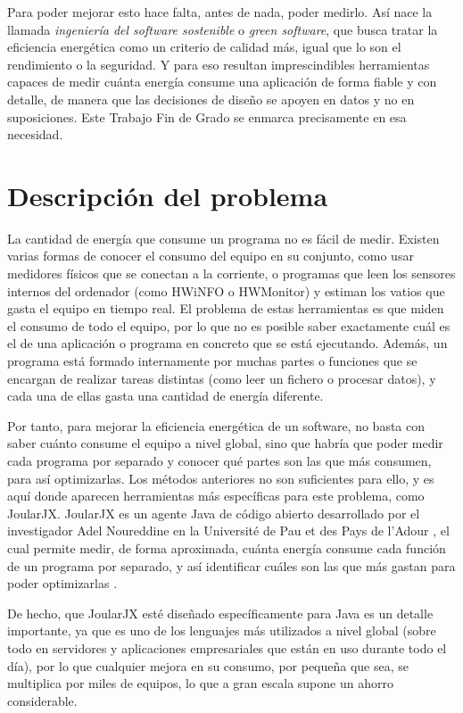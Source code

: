 Para poder mejorar esto hace falta, antes de nada, poder medirlo. Así nace la
llamada \emph{ingeniería del software sostenible} o \emph{green software}, que
busca tratar la eficiencia energética como un criterio de calidad más, igual
que lo son el rendimiento o la seguridad. Y para eso resultan imprescindibles
herramientas capaces de medir cuánta energía consume una aplicación de forma
fiable y con detalle, de manera que las decisiones de diseño se apoyen en datos
y no en suposiciones. Este Trabajo Fin de Grado se enmarca precisamente en esa
necesidad.



\section{Descripción del problema}
\label{sec:descripcion-problema}

La cantidad de energía que consume un programa no es fácil de medir. Existen
varias formas de conocer el consumo del equipo en su conjunto, como usar
medidores físicos que se conectan a la corriente, o programas que leen los
sensores internos del ordenador (como HWiNFO o HWMonitor) y estiman los vatios
que gasta el equipo en tiempo real. El problema de estas herramientas es que miden el consumo de todo el equipo, por lo que no es posible saber exactamente cuál es el de una aplicación o programa en concreto que se está ejecutando. Además, un programa está formado
internamente por muchas partes o funciones que se encargan de realizar tareas
distintas (como leer un fichero o procesar datos), y cada una de ellas gasta
una cantidad de energía diferente.



Por tanto, para mejorar la eficiencia energética de un software, no basta con
saber cuánto consume el equipo a nivel global, sino que habría que poder medir
cada programa por separado y conocer qué partes son las que más consumen, para
así optimizarlas. Los métodos anteriores no son suficientes para ello, y es aquí
donde aparecen herramientas más específicas para este problema, como JoularJX.
JoularJX es un agente Java de código abierto desarrollado por el investigador
Adel Noureddine en la Université de Pau et des Pays de l'Adour
\cite{joularjx2022, joularjxrepo}, el cual permite medir,
de forma aproximada, cuánta energía consume cada función de un programa por
separado, y así identificar cuáles son las que más gastan para poder optimizarlas \cite{joularjx3}.

De hecho, que JoularJX esté diseñado específicamente para Java es un detalle importante, ya que es uno de los lenguajes más utilizados a nivel global (sobre todo en servidores y aplicaciones
empresariales que están en uso durante todo el día), por lo que cualquier mejora en
su consumo, por pequeña que sea, se multiplica por miles de equipos, lo que a gran escala supone un ahorro considerable. 

